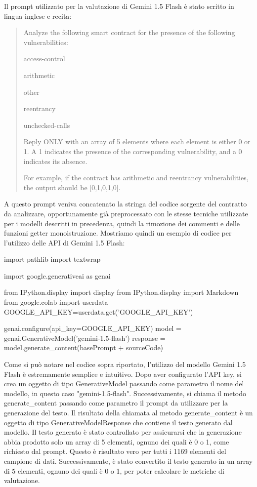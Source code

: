 \documentclass[../../Thesis.tex]{subfiles}
\begin{document}
Il prompt utilizzato per la valutazione di Gemini 1.5 Flash è stato scritto in lingua inglese e recita: 

\begin{quote}
Analyze the following smart contract for the presence of the following vulnerabilities:

access-control 

arithmetic

other

reentrancy

unchecked-calls

Reply ONLY with an array of 5 elements where each element is either 0 or 1. A 1 indicates the presence of the corresponding vulnerability, and a 0 indicates its absence.

For example, if the contract has arithmetic and reentrancy vulnerabilities, the output should be [0,1,0,1,0].
\end{quote}   
A questo prompt veniva concatenato la stringa del codice sorgente del contratto da analizzare, opportunamente già preprocessato con le stesse tecniche utilizzate per i modelli descritti in precedenza, quindi la rimozione dei commenti e delle funzioni getter monoistruzione. Mostriamo quindi un esempio di codice per l'utilizzo delle API di Gemini 1.5 Flash:
\begin{python}
import pathlib
import textwrap

import google.generativeai as genai

from IPython.display import display
from IPython.display import Markdown
from google.colab import userdata
GOOGLE_API_KEY=userdata.get('GOOGLE_API_KEY')

genai.configure(api_key=GOOGLE_API_KEY)
model = genai.GenerativeModel('gemini-1.5-flash')
response = model.generate_content(basePrompt + sourceCode)
\end{python}

Come si può notare nel codice sopra riportato, l'utilizzo del modello Gemini 1.5 Flash è estremamente semplice e intuitivo. Dopo aver configurato l'API key, si crea un oggetto di tipo GenerativeModel passando come parametro il nome del modello, in questo caso "gemini-1.5-flash". Successivamente, si chiama il metodo generate\_content passando come parametro il prompt da utilizzare per la generazione del testo. Il risultato della chiamata al metodo generate\_content è un oggetto di tipo GenerativeModelResponse che contiene il testo generato dal modello. 
Il testo generato è stato controllato per assicurarsi che la generazione abbia prodotto solo un array di 5 elementi, ognuno dei quali è 0 o 1, come richiesto dal prompt. Questo è risultato vero per tutti i 1169 elementi del campione di dati. Successivamente, è stato convertito il testo generato in un array di 5 elementi, ognuno dei quali è 0 o 1, per poter calcolare le metriche di valutazione.
\end{document}
